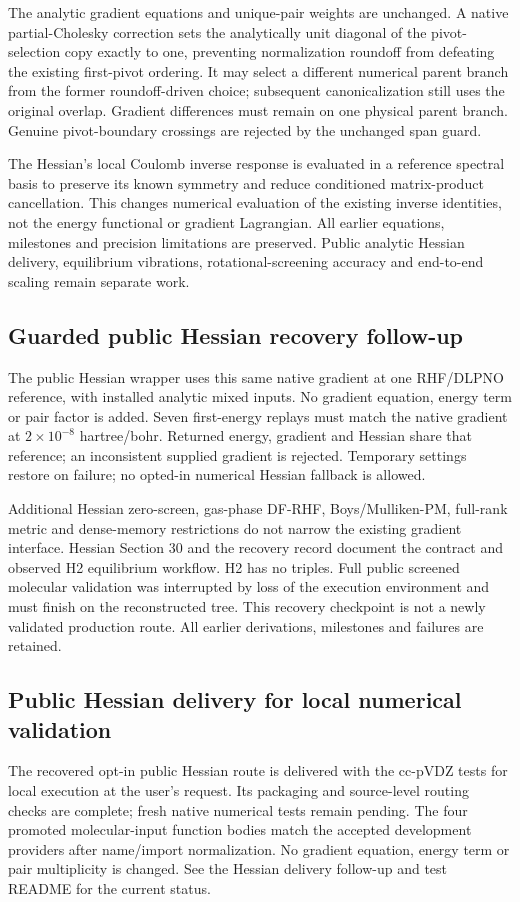 \documentclass[11pt]{article}
\begin{document}
The analytic gradient equations and unique-pair weights are unchanged.
A native partial-Cholesky correction sets the analytically unit diagonal
of the pivot-selection copy exactly to one, preventing normalization
roundoff from defeating the existing first-pivot ordering. It may select
a different numerical parent branch from the former roundoff-driven
choice; subsequent canonicalization still uses the original overlap.
Gradient differences must remain on one physical parent branch. Genuine
pivot-boundary crossings are rejected by the unchanged span guard.

The Hessian's local Coulomb inverse response is evaluated in a reference
spectral basis to preserve its known symmetry and reduce conditioned
matrix-product cancellation. This changes numerical evaluation of the
existing inverse identities, not the energy functional or gradient
Lagrangian. All earlier equations, milestones and precision limitations
are preserved. Public analytic Hessian delivery, equilibrium vibrations,
rotational-screening accuracy and end-to-end scaling remain separate work.


\subsection{Guarded public Hessian recovery follow-up}
The public Hessian wrapper uses this same native gradient at one RHF/DLPNO
reference, with installed analytic mixed inputs. No gradient equation,
energy term or pair factor is added. Seven first-energy replays must match
the native gradient at $2\times10^{-8}$ hartree/bohr. Returned energy,
gradient and Hessian share that reference; an inconsistent supplied gradient
is rejected. Temporary settings restore on failure; no opted-in numerical
Hessian fallback is allowed.

Additional Hessian zero-screen, gas-phase DF-RHF, Boys/Mulliken-PM,
full-rank metric and dense-memory restrictions do not narrow the existing
gradient interface. Hessian Section 30 and the recovery record document
the contract and observed H2 equilibrium workflow. H2 has no triples.
Full public screened molecular validation was interrupted by loss of the
execution environment and must finish on the reconstructed tree. This
recovery checkpoint is not a newly validated production route. All earlier
derivations, milestones and failures are retained.

\subsection{Public Hessian delivery for local numerical validation}
The recovered opt-in public Hessian route is delivered with the cc-pVDZ
tests for local execution at the user's request. Its packaging and
source-level routing checks are complete; fresh native numerical tests
remain pending. The four promoted molecular-input function bodies match
the accepted development providers after name/import normalization.
No gradient equation, energy term or pair multiplicity is changed.
See the Hessian delivery follow-up and test README for the current status.
\end{document}
